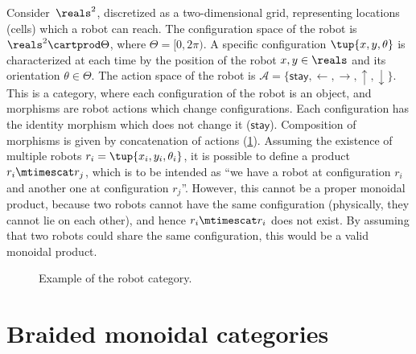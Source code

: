 \begin{example}
    \label{ex:robot}
    Consider~$\reals^2$, discretized as a two-dimensional grid, representing locations (cells) which a robot can reach.
    The configuration space of the robot is $\reals^2\cartprod \Theta$, where $\Theta=[0,2\pi)$.
    A specific configuration $\tup{x,y,\theta}$ is characterized at each time by the position of the robot $x,y\in \reals$ and its orientation $\theta \in \Theta$.
    The action space of the robot is $\mathcal{A}=\{\mathsf{stay},\leftarrow, \rightarrow, \uparrow, \downarrow\}$.
    This is a category, where each configuration of the robot is an object, and morphisms are robot actions which change configurations.
    Each configuration has the identity morphism which does not change it ($\mathsf{stay}$).
    Composition of morphisms is given by concatenation of actions (\cref{fig:robotcategory}).
    Assuming the existence of multiple robots $r_i=\tup{x_i,y_i,\theta_i}$, it is possible to define a product $r_i\mtimescat r_j$, which is to be intended as ``we have a robot at configuration $r_i$ and another one at configuration $r_j$''.
    However, this cannot be a proper monoidal product, because two robots cannot have the same configuration (physically, they cannot lie on each other), and hence $r_i\mtimescat r_i$ does not exist.
    By assuming that two robots could share the same configuration, this would be a valid monoidal product.
    \begin{figure}[tbh]
        \centering
        \caption{Example of the robot category. }
        \label{fig:robotcategory}
    \end{figure}
\end{example}

\section{Braided monoidal categories}



